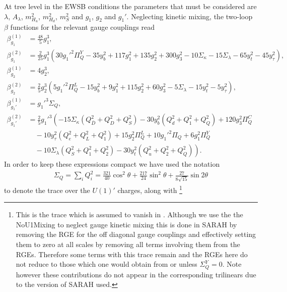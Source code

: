 \documentclass[preprint,amsmath,amssymb,aps,superscriptaddress,prd,showpacs,floatfix,nofootinbib]{revtex4-1}
\begin{document}
At tree level in the EWSB
conditions the parameters that must be considered are $\lambda$,
$A_\lambda$, $m_{H_u}^2$, $m_{H_d}^2$, $m_S^2$ and $g_1$, $g_2$ and
$g_1'$. Neglecting kinetic mixing, the two-loop $\beta$ functions for
the relevant gauge couplings read
\begin{subequations}\label{eq:USSMGaugeBetas}
\begin{align}
\beta_{g_1}^{(1)}&=\frac{48}{5}g_1^3,\label{eq:USSMg1BetaOneLoop}\\
\beta_{g_1}^{(2)}&=\frac{2}{25} g_1^3 \left(30 g_1'^2 \Pi_{Q}^Y-35 y_b^2+117 g_1^2+135 g_2^2+300 g_3^2-10 \Sigma _{\kappa }-15
   \Sigma _{\lambda }-65 y_t^2-45 y_{\tau }^2\right),\label{eq:USSMg1BetaTwoLoop}\\
\beta_{g_2}^{(1)}&=4g_2^3,\label{eq:USSMg2BetaOneLoop}\\
\beta_{g_2}^{(2)}&=\frac{2}{5} g_2^3 \left(5 g_1'^2 \Pi _{Q}^L-15 y_b^2+9 g_1^2+115 g_2^2+60 g_3^2-5 \Sigma _{\lambda }-15
   y_t^2-5 y_{\tau }^2\right),\label{eq:USSMg2BetaTwoLoop}\\
\beta_{g_1'}^{(1)}&=g_1'^3\Sigma_{Q},\label{eq:USSMg1pBetaOneLoop}\\
\beta_{g_1'}^{(2)}&=\frac{2}{5} g_1'^3 \left(-15 \Sigma _{\kappa } \left(Q_{\bar{D}}^2+Q_D^2+Q_S^2\right)-30
   y_b^2 \left(Q_d^2+Q_1^2+Q_Q^2\right)+120 g_3^2 \Pi _{Q}^C\right.\nonumber \\
&\quad{}-10 y_{\tau }^2
   \left(Q_e^2+Q_L^2+Q_1^2\right)+15 g_2^2 \Pi _{Q}^L+10 g_1'^2 \Pi _{Q}+6
   g_1^2 \Pi _{Q}^Y\nonumber\\
&\quad\left.{}-10 \Sigma _{\lambda } \left(Q_S^2+Q_1^2+Q_2^2\right)-30 y_t^2
   \left(Q_u^2+Q_2^2+Q_Q^2\right)\right).\label{eq:USSMg1pBetaTwoLoop}
\end{align}
\end{subequations}
In order to keep these expressions compact we have used the notation
\begin{align*}
\Sigma_{Q}=\sum_i Q_i^2=\frac{321}{40}\cos^2\theta+\frac{217}{24}\sin^2\theta+\frac{27}{8\sqrt{15}}\sin 2\theta
\end{align*}
to denote the trace over the $U(1)'$ charges, along
with \footnote{This is the trace which is assumed to vanish in
  \cite{Martin:1993zk}.  Although we use the the NoU1Mixing to neglect
  gauge kinetic mixing this is done in SARAH by removing the RGE for
  the off diagonal gauge couplings and effectively setting them to
  zero at all scales by removing all terms involving them from the
  RGEs.  Therefore some terms with this trace remain and the RGEs here
  do not reduce to those which one would obtain from
  \cite{Martin:1993zk} or \cite{Athron:2009bs} unless $\Sigma_{Q}^Y =
  0$.  Note however these contributions do not appear in the
  corresponding trilinears due to the version of SARAH used. }
\end{document}
